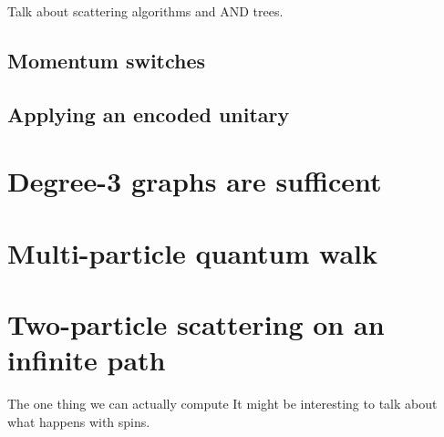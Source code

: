 \documentclass[../thesis-main/thesis-main]{subfiles}
\begin{document}
Talk about scattering algorithms and AND trees.

\subsection{Momentum switches}

\subsection{Applying an encoded unitary}

\section{Degree-3 graphs are sufficent}

\section{Multi-particle quantum walk}

\section{Two-particle scattering on an infinite path}

The one thing we can actually compute
It might be interesting to talk about what happens with spins.
\end{document}
